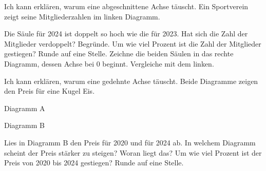 \begin{aufgabe}{Ich kann erklären, warum eine abgeschnittene Achse täuscht.}
Ein Sportverein zeigt seine Mitgliederzahlen im linken Diagramm.

\noindent\begin{minipage}[t]{0.48\linewidth}
\end{minipage}\hfill
\begin{minipage}[t]{0.48\linewidth}
\end{minipage}

\begin{teile}
\teil Die Säule für 2024 ist doppelt so hoch wie die für 2023. Hat sich die Zahl der Mitglieder verdoppelt? Begründe.
\teil Um wie viel Prozent ist die Zahl der Mitglieder gestiegen? Runde auf eine Stelle. \hfill \leerfeld[\%]
\teil Zeichne die beiden Säulen in das rechte Diagramm, dessen Achse bei 0 beginnt. Vergleiche mit dem linken.
\end{teile}
\end{aufgabe}

\begin{aufgabe}{Ich kann erklären, warum eine gedehnte Achse täuscht.}
Beide Diagramme zeigen den Preis für eine Kugel Eis.

\noindent\begin{minipage}[t]{0.48\linewidth}
Diagramm A\par
{}
\end{minipage}\hfill
\begin{minipage}[t]{0.48\linewidth}
Diagramm B\par
{}
\end{minipage}

\begin{teile}
\teil Lies in Diagramm B den Preis für 2020 und für 2024 ab. \hfill \leerfeld[€] \quad \leerfeld[€]
\teil In welchem Diagramm scheint der Preis stärker zu steigen? Woran liegt das?
\teil Um wie viel Prozent ist der Preis von 2020 bis 2024 gestiegen? Runde auf eine Stelle. \hfill \leerfeld[\%]
\end{teile}
\end{aufgabe}


